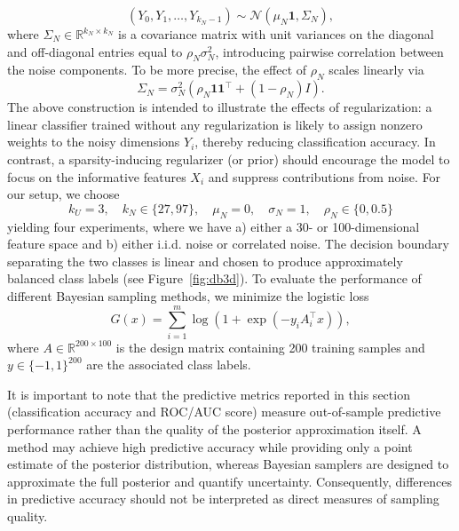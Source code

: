 \documentclass[11pt, twoside]{report}
\begin{document}
\[
(Y_0, Y_1, \dots, Y_{k_N-1}) \sim \mathcal{N}(\mu_N \mathbf{1}, \Sigma_N),
\]
where $\Sigma_N \in \mathbb{R}^{k_N \times k_N}$ is a covariance matrix with unit variances on the diagonal and off-diagonal entries equal to $\rho_N \sigma_N^2$,  introducing pairwise correlation between the noise components. To be more precise, the effect of $\rho_N$ scales linearly via
\[
\Sigma_N = \sigma_N^2 \left( \rho_N \mathbf{1} \mathbf{1}^\top + (1 - \rho_N) I \right).
\] 
The above construction is intended to illustrate the effects of regularization: a linear classifier trained without any regularization is likely to assign nonzero weights to the noisy dimensions $Y_i$, thereby reducing classification accuracy. In contrast, a sparsity-inducing regularizer (or prior) should encourage the model to focus on the informative features $X_i$ and suppress contributions from noise. For our setup, we choose
\[
k_U = 3, \quad k_N \in \{27, 97\}, \quad \mu_N = 0, \quad \sigma_N = 1, \quad \rho_N \in \{0, 0.5\}
\]
yielding four experiments, where we have a) either a 30- or 100-dimensional feature space and b) either i.i.d. noise or correlated noise. The decision boundary separating the two classes is linear and chosen to produce approximately balanced class labels (see Figure~\ref{fig:db3d}). To evaluate the performance of different Bayesian sampling methods, we minimize the logistic loss
\begin{equation} \label{eq:binary_logistic}
    G(x) = \sum_{i=1}^m \log\left(1 + \exp(-y_i A_i^\top x)\right),
\end{equation}
where $A \in \mathbb{R}^{200 \times 100}$ is the design matrix containing 200 training samples and $y \in \{-1, 1\}^{200}$ are the associated class labels.

It is important to note that the predictive metrics reported in this section
(classification accuracy and ROC/AUC score) measure out-of-sample predictive
performance rather than the quality of the posterior approximation itself.
A method may achieve high predictive accuracy while providing only a point
estimate of the posterior distribution, whereas Bayesian samplers are designed
to approximate the full posterior and quantify uncertainty. Consequently,
differences in predictive accuracy should not be interpreted as direct measures
of sampling quality.
\end{document}
